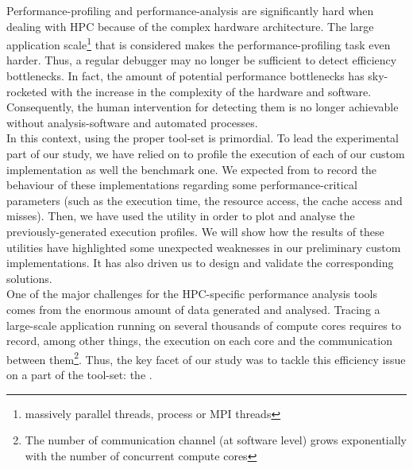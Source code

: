 	Performance-profiling and performance-analysis are significantly hard when dealing with HPC because of the complex hardware architecture.   The large application scale\footnote{massively parallel threads, process or MPI threads} that is considered makes the performance-profiling task even harder.   Thus, a regular debugger may no longer be sufficient to detect efficiency bottlenecks.   In fact, the amount of potential performance bottlenecks has sky-rocketed with the increase in the complexity of the hardware and software.   Consequently, the human intervention for detecting them is no longer achievable without analysis-software and automated processes.\\

	In this context, using the proper tool-set is primordial.   To lead the experimental part of our study, we have relied on \toolProfiling\cite{knupfer2012score} to profile the execution of each of our custom implementation as well the benchmark one.   We expected from \toolProfiling\space to record the behaviour of these implementations regarding some performance-critical parameters (such as the execution time, the \notationIO\space resource access, the cache access and misses).   Then, we have used the \toolTraceAnalyzed\cite{saviankou2015cube} utility in order to plot and analyse the previously-generated execution profiles.   We will show how the results of these utilities have highlighted some unexpected weaknesses in our preliminary custom implementations.   It has also driven us to design and validate the corresponding solutions.\\

	One of the major challenges for the HPC-specific performance analysis tools comes from the enormous amount of data generated and analysed.   Tracing a large-scale application running on several thousands of compute cores requires to record, among other things, the execution on each core and the communication between them\footnote{The number of communication channel (at software level) grows exponentially with the number of concurrent compute cores}.   Thus, the key facet of our study was to tackle this efficiency issue on a part of the \toolTraceAnalyzed\space tool-set: the \toolTargetSoftware.


